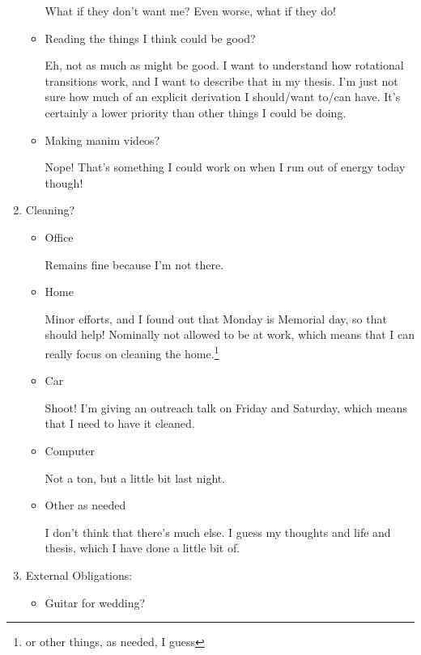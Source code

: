 \documentclass[12pt]{article}
\renewcommand{\,}{\textsuperscript{,}}
\begin{document}
\begin{enumerate}
\begin{itemize}
What if they don't want me?  
Even worse, what if they do!

\item Reading the things I think could be good?

Eh, not as much as might be good. I want to understand how rotational transitions work, and I want to describe that in my thesis. I'm just not sure how much of an explicit derivation I should/want to/can have. It's certainly a lower priority than other things I could be doing.

\item Making manim videos?

Nope! That's something I could work on when I run out of energy today though!

\end{itemize}

\item Cleaning?

\begin{itemize}

\item Office

Remains fine because I'm not there.

\item Home

Minor efforts, and I found out that Monday is Memorial day, so that should help!  
Nominally not allowed to be at work, which means that I can really focus on cleaning the home.\footnote{or other things, as needed, I guess}

\item Car

Shoot! I'm giving an outreach talk on Friday and Saturday, which means that I need to have it cleaned.

\item Computer

Not a ton, but a little bit last night.

\item Other as needed

I don't think that there's much else. I guess my thoughts and life and thesis, which I have done a little bit of.

\end{itemize}

\item External Obligations:

\begin{itemize}

\item Guitar for wedding?


\end{itemize}
\end{enumerate}
\end{document}
